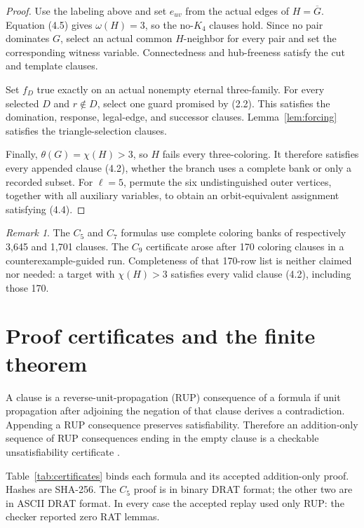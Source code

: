 \documentclass[11pt]{article}
\theoremstyle{definition}
\theoremstyle{remark}
\newtheorem{remark}[theorem]{Remark}
\begin{document}
\begin{proof}
Use the labeling above and set \(e_{uv}\) from the actual edges of
\(H=\overline G\).  Equation (4.5) gives \(\omega(H)=3\), so the no-\(K_4\)
clauses hold.  Since no pair dominates \(G\), select an actual common
\(H\)-neighbor for every pair and set the corresponding witness variable.
Connectedness and hub-freeness satisfy the cut and template clauses.

Set \(f_D\) true exactly on an actual nonempty eternal three-family.  For
every selected \(D\) and \(r\notin D\), select one guard promised by (2.2).
This satisfies the domination, response, legal-edge, and successor clauses.
Lemma~\ref{lem:forcing} satisfies the triangle-selection clauses.

Finally, \(\theta(G)=\chi(H)>3\), so \(H\) fails every three-coloring.  It
therefore satisfies every appended clause (4.2), whether the branch uses a
complete bank or only a recorded subset.  For \(\ell=5\), permute the six
undistinguished outer vertices, together with all auxiliary variables, to
obtain an orbit-equivalent assignment satisfying (4.4).
\end{proof}

\begin{remark}
The \(C_5\) and \(C_7\) formulas use complete coloring banks of respectively
3,645 and 1,701 clauses.  The \(C_9\) certificate arose after 170 coloring
clauses in a counterexample-guided run.  Completeness of that 170-row list is
neither claimed nor needed: a target with \(\chi(H)>3\) satisfies every
valid clause (4.2), including those 170.
\end{remark}

\section{Proof certificates and the finite theorem}\label{sec:certificates}

A clause is a reverse-unit-propagation (RUP) consequence of a formula if
unit propagation after adjoining the negation of that clause derives a
contradiction.  Appending a RUP consequence preserves satisfiability.
Therefore an addition-only sequence of RUP consequences ending in the empty
clause is a checkable unsatisfiability certificate
\cite{WetzlerHeuleHunt2014}.

Table~\ref{tab:certificates} binds each formula and its accepted
addition-only proof.  Hashes are SHA-256.  The \(C_5\) proof is in binary
DRAT format; the other two are in ASCII DRAT format.  In every case the
accepted replay used only RUP: the checker reported zero RAT lemmas.
\end{document}
